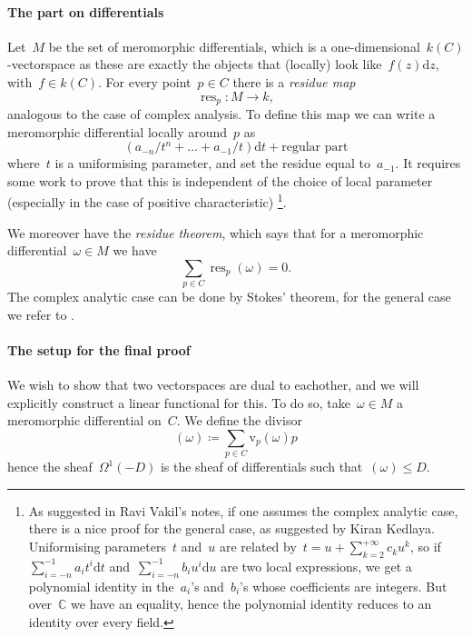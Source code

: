 \documentclass[10pt,a4paper]{article}
\theoremstyle{lecture}
\newcommand\dash{\nobreakdash-\hspace{0pt}}
\newcommand\dd{\mathrm{d}}
\DeclareMathOperator\res{res}
\begin{document}
\paragraph{The part on differentials}

Let~$M$ be the set of meromorphic differentials, which is a one-dimensional~$k(C)$\dash vectorspace as these are exactly the objects that (locally) look like~$f(z)\dd z$, with~$f\in k(C)$. For every point~$p\in C$ there is a \emph{residue map}
\begin{equation}
  \res_p\colon M\to k,
\end{equation}
analogous to the case of complex analysis. To define this map we can write a meromorphic differential locally around~$p$ as
\begin{equation}
  (a_{-n}/t^n+\dotso+a_{-1}/t)\dd t+\text{regular part}
\end{equation}
where~$t$ is a uniformising parameter, and set the residue equal to~$a_{-1}$. It requires some work to prove that this is independent of the choice of local parameter (especially in the case of positive characteristic) \cite{serre-groupes-algebriques}\footnote{As suggested in Ravi Vakil's notes, if one assumes the complex analytic case, there is a nice proof for the general case, as suggested by Kiran Kedlaya. Uniformising parameters~$t$ and~$u$ are related by~$t=u+\sum_{k=2}^{+\infty}c_ku^k$, so if~$\sum_{i=-n}^{-1}a_it^i\dd t$ and~$\sum_{i=-n}^{-1}b_iu^i\dd u$ are two local expressions, we get a polynomial identity in the~$a_i$'s and~$b_i$'s whose coefficients are integers. But over~$\mathbb{C}$ we have an equality, hence the polynomial identity reduces to an identity over every field.}.

We moreover have the \emph{residue theorem}, which says that for a meromorphic differential~$\omega\in M$ we have
\begin{equation}
  \sum_{p\in C}\res_p(\omega)=0.
\end{equation}
The complex analytic case can be done by Stokes' theorem, for the general case we refer to \cite{serre-groupes-algebriques}.

\paragraph{The setup for the final proof}
We wish to show that two vectorspaces are dual to eachother, and we will explicitly construct a linear functional for this. To do so, take~$\omega\in M$ a meromorphic differential on~$C$. We define the divisor
\begin{equation}
  (\omega)\coloneqq\sum_{p\in C}\mathrm{v}_p(\omega)p
\end{equation}
hence the sheaf~$\Omega^1(-D)$ is the sheaf of differentials such that~$(\omega)\leq D$.
\end{document}
